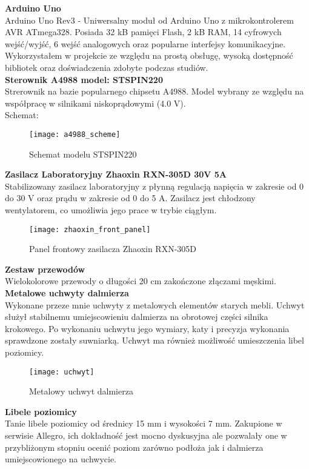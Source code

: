 \textbf{Arduino Uno}\\
Arduino Uno Rev3 - Uniwersalny moduł od Arduino Uno z mikrokontrolerem AVR ATmega328. Posiada 32 kB pamięci Flash, 2 kB RAM, 14 cyfrowych wejść/wyjść, 6 wejść analogowych oraz popularne interfejsy komunikacyjne. Wykorzystałem w projekcie ze względu na prostą obsługę, wysoką dostępność bibliotek oraz doświadczenia zdobyte podczas studiów.\\

\textbf{Sterownik A4988 model: STSPIN220}\\
Strerownik na bazie popularnego chipsetu A4988. Model wybrany ze względu na współpracę w silnikami niskoprądowymi (4.0 V).\\

Schemat:\\
\begin{figure}[h]
    \centering
    \texttt{[image: a4988\_scheme]}
    \caption{Schemat modelu STSPIN220}
    \label{fig:a4988_scheme}
\end{figure}

\textbf{Zasilacz Laboratoryjny Zhaoxin RXN-305D 30V 5A}\\
Stabilizowany zasilacz laboratoryjny z płynną regulacją napięcia w zakresie od 0 do 30 V oraz prądu w zakresie od 0 do 5 A. Zasilacz jest chłodzony wentylatorem, co umożliwia jego prace w trybie ciągłym.
\begin{figure}[h]
    \centering
    \texttt{[image: zhaoxin\_front\_panel]}
    \caption{Panel frontowy zasilacza Zhaoxin RXN-305D}
    \label{fig:zhaoxin_front_panel}
\end{figure}


\textbf{Zestaw przewodów}\\
Wielokolorowe przewody o długości 20 cm zakończone złączami męskimi.\\

\textbf{Metalowe uchwyty dalmierza}\\
Wykonane przeze mnie uchwyty z metalowych elementów starych mebli. Uchwyt służył stabilnemu umiejscowieniu dalmierza na obrotowej części silnika krokowego. Po wykonaniu uchwytu jego wymiary, katy i precyzja wykonania sprawdzone zostały suwniarką. Uchwyt ma również możliwość umieszczenia libel poziomicy.
\begin{figure}[h]
    \centering
    \texttt{[image: uchwyt]}
    \caption{Metalowy uchwyt dalmierza}
    \label{fig:uchwyt}
\end{figure}

\textbf{Libele poziomicy}\\
Tanie libele poziomicy od średnicy 15 mm i wysokości 7 mm. Zakupione w serwisie Allegro, ich dokładność jest mocno dyskusyjna ale pozwalały one w przybliżonym stopniu ocenić poziom zarówno podłoża jak i dalmierza umiejscowionego na uchwycie.

